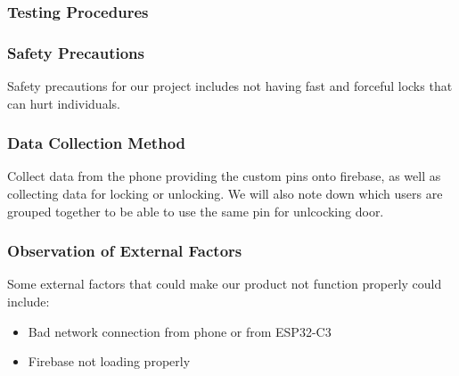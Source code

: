 \subsubsection{Testing Procedures}
\subsubsection{Safety Precautions}
Safety precautions for our project includes not having fast and forceful locks that can hurt individuals.

\subsubsection{Data Collection Method}
Collect data from the phone providing the custom pins onto firebase, as well as collecting data for locking or unlocking. We will also note down which users are grouped together to be able to use the same pin for unlcocking door.

\subsubsection{Observation of External Factors}
Some external factors that could make our product not function properly could include:

\begin{itemize}
    \item Bad network connection from phone or from ESP32-C3
    \item Firebase not loading properly
\end{itemize}


